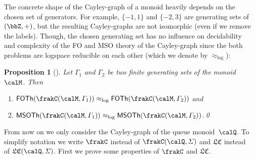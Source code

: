 \documentclass[a4paper,numberwithinsect,USenglish]{lipics-v2018}
\theoremstyle{plain}
\newtheorem{proposition}[theorem]{Proposition}
\theoremstyle{remark}
\newcommand{\classfont}[1]{\mathsf{#1}}
\newcommand{\Qx}{\calQ}
\newcommand{\cayley}[2]{\frakC(#1,#2)}
\newcommand{\lcayley}[2]{\mathfrak{LC}(#1,#2)}
\newcommand{\cQ}{\frakC}
\newcommand{\lcQ}{\mathfrak{LC}}
\newcommand{\FOTh}[1]{\classfont{FOTh}(#1)}
\newcommand{\MSOTh}[1]{\classfont{MSOTh}(#1)}
\newcommand{\eqlog}{\approx_{\operatorname{log}}}
\begin{document}
The concrete shape of the Cayley-graph of a monoid heavily depends on the chosen set of generators. For example, $\{-1,1\}$ and $\{-2,3\}$ are generating sets of $(\bbZ,+)$, but the resulting Cayley-graphs are not isomorphic (even if we remove the labels). Though, the chosen generating set has no influence on decidability and complexity of the FO and MSO theory of the Cayley-graph since the both problems are logspace reducible on each other (which we denote by $\eqlog$):

\begin{proposition}[{{\!\!\cite[Proposition~3.1]{KusL06}}}]
	Let $\varGamma_1$ and $\varGamma_2$ be two finite generating sets of the monoid~$\calM$. Then
	\begin{enumerate}[(1)]
		\item $\FOTh{\cayley{\calM}{\varGamma_1}}\eqlog\FOTh{\cayley{\calM}{\varGamma_2}}$ and
		\item $\MSOTh{\cayley{\calM}{\varGamma_1}}\eqlog\MSOTh{\cayley{\calM}{\varGamma_2}}$.\qed
	\end{enumerate}
\end{proposition}

From now on we only consider the Cayley-graph of the queue monoid~$\Qx$. To simplify notation we write $\cQ$ instead of $\cayley{\Qx}{\varSigma}$ and $\lcQ$ instead of $\lcayley{\Qx}{\varSigma}$. First we prove some properties of $\cQ$ and $\lcQ$.
\end{document}
